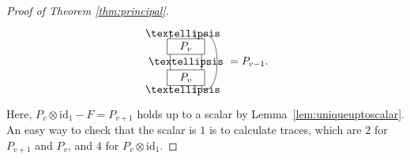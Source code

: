 \documentclass[10pt,a4paper]{amsart}
\newcommand{\id}{\mathrm{id}}
\begin{document}
\begin{proof}[Proof of Theorem \ref{thm:principal}]
\[\begin{tikzpicture}[baseline=-0.5ex,scale=0.05]
\node at (-10,10) {$P_v$};
\draw (-22,5) rectangle (2,15);
\node at (-10,-10) {$P_v$};
\draw (-22,-15) rectangle (2,-5);
\draw (-20,-5) -- (-20,5);
\node at (-10,0) {$\dots$};
\draw (0,-5) -- (0,5);
\draw (0,-15) .. controls (0,-20) and (10,-20) .. (10,0)
              .. controls (10,20) and (0,20) .. (0,15);
\draw (-20,-20) -- (-20,-15);
\node at (-12,-18) {$\dots$};
\draw (-4,-20) -- (-4,-15);
\draw (-20,15) -- (-20,20);
\node at (-12,18) {$\dots$};
\draw (-4,15) -- (-4,20);
\end{tikzpicture}
= P_{v-1}.
\]
Here, $P_v\otimes\id_1-F=P_{v+1}$ holds up to a scalar by
Lemma~\ref{lem:uniqueuptoscalar}.  An easy way to check that the scalar
is $1$ is to calculate traces, which are $2$ for $P_{v+1}$ and $P_v$,
and $4$ for $P_v\otimes\id_1$.
\end{proof}
\end{document}
